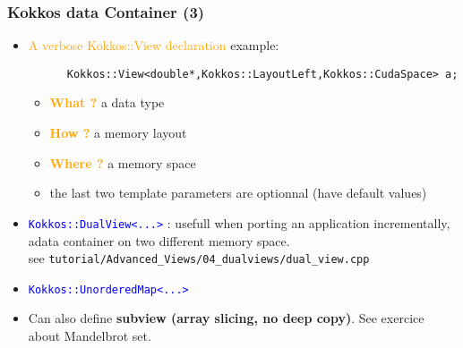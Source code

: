 \begin{frame}[fragile=singleslide]
  \frametitle{Kokkos data Container (3)}

  \begin{itemize}
  \item \textcolor{orange}{A verbose Kokkos::View declaration} example:
    \begin{verbatim}
      Kokkos::View<double*,Kokkos::LayoutLeft,Kokkos::CudaSpace> a;
    \end{verbatim}
    \begin{itemize}
    \item \textcolor{orange}{\textbf{What ?}} a data type
    \item \textcolor{orange}{\textbf{How ?}} a memory layout
    \item \textcolor{orange}{\textbf{Where ?}} a memory space
    \item the last two template parameters are optionnal (have default values)
    \end{itemize}
  \item \textcolor{blue}{\texttt{Kokkos::DualView<...>}} : usefull when porting an application incrementally, adata container on two different memory space.\\
    see \texttt{tutorial/Advanced\_Views/04\_dualviews/dual\_view.cpp}
  \item \textcolor{blue}{\texttt{Kokkos::UnorderedMap<...>}}
  \item Can also define \textbf{subview (array slicing, no deep copy)}. See exercice about Mandelbrot set.
  \end{itemize}
  
\end{frame}

